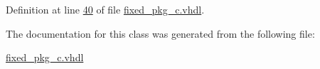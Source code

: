 Definition at line \hyperlink{fixed__pkg__c_8vhdl_source_l00040}{40} of file \hyperlink{fixed__pkg__c_8vhdl_source}{fixed\+\_\+pkg\+\_\+c.\+vhdl}.



The documentation for this class was generated from the following file\+:\begin{DoxyCompactItemize}
\item 
\hyperlink{fixed__pkg__c_8vhdl}{fixed\+\_\+pkg\+\_\+c.\+vhdl}\end{DoxyCompactItemize}
